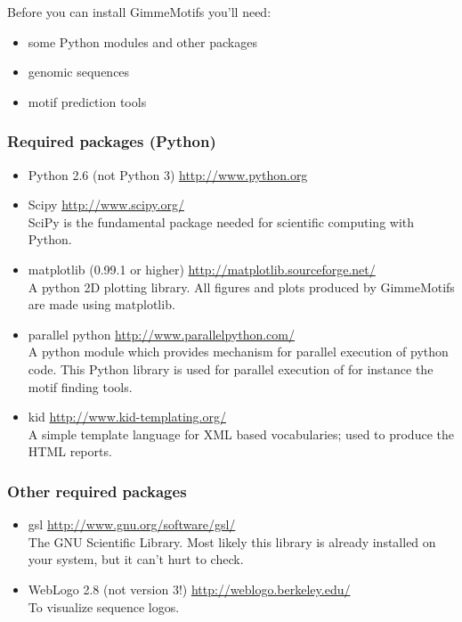 \documentclass[10pt]{article}
\begin{document}
Before you can install GimmeMotifs you'll need: 
\begin{itemize}
 \item some Python modules and other packages
 \item genomic sequences 
 \item motif prediction tools
\end{itemize}

\subsubsection{Required packages (Python)}
\begin{itemize}
\item Python 2.6 (not Python 3) \url{http://www.python.org}
\item Scipy \url{http://www.scipy.org/} \\
SciPy is the fundamental package needed for scientific computing with Python. 
\item matplotlib (0.99.1 or higher) \url{http://matplotlib.sourceforge.net/} \\
A python 2D plotting library. All figures and plots produced by GimmeMotifs are made using matplotlib.
\item parallel python \url{http://www.parallelpython.com/} \\
A python module which provides mechanism for parallel execution of python code. This Python library is used for parallel execution of for instance the motif finding tools. 
\item kid \url{http://www.kid-templating.org/} \\
A simple template language for XML based vocabularies; used to produce the HTML reports.
\end{itemize}

\subsubsection{Other required packages}
\begin{itemize}

 \item gsl \url{http://www.gnu.org/software/gsl/} \\
The GNU Scientific Library. 
Most likely this library is already installed on your system, but it can't hurt to check.
 \item WebLogo 2.8 (not version 3!) \url{http://weblogo.berkeley.edu/} \\
To visualize sequence logos.
\end{itemize}
\end{document}
